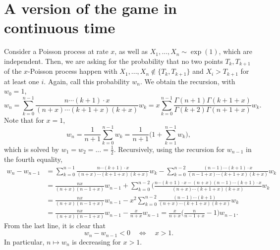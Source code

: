 \documentclass{article}
\theoremstyle{definition}
\theoremstyle{step} \newtheorem{step}{Step}
\begin{document}
\newpage

\section{A version of the game in continuous time}
Consider a Poisson process at rate $x$, as well as $X_1,...,X_n \sim
\exp(1)$, which are independent. Then, we are asking for the
probability that no two points $T_k, T_{k+1}$ of the $x$-Poisson
process happen with $X_1,...,X_n \notin \{T_k, T_{k+1}\}$ and $X_i >
T_{k+1}$ for at least one $i$. Again, call this probability $w_n$. We
obtain the recursion, with $w_0=1$,
$$ w_n = \sum_{k=0}^{n-1} \frac{n\cdots (k+1) \cdot x}{(n+x)\cdots
  (k+1+x)(k+x)} w_k = x \sum_{k=0}^{n-1}
\frac{\Gamma(n+1)\Gamma(k+1+x)}{\Gamma(k+2)\Gamma(n+1+x)} w_k.$$
  Note that for $x=1$,
$$ w_n = \frac{1}{n+1} \sum_{k=0}^{n-1} w_k = \frac{1}{n+1} \Big(1 +
  \sum_{k=1}^{n-1} w_k\Big), $$ which is solved by $w_1 = w_2 = ... =
  \tfrac 12$. Recursively, using the recursion for $w_{n-1}$ in the
  fourth equality,
\begin{align*}
w_n - w_{n-1} & = \sum_{k=0}^{n-1} \frac{n\cdots (k+1) \cdot
  x}{(n+x)\cdots (k+1+x)(k+x)} w_k - \sum_{k=0}^{n-2}
\frac{(n-1)\cdots (k+1) \cdot x}{(n-1+x)\cdots (k+1+x)(k+x)} w_k \\ &
= \frac{nx}{(n+x)(n-1+x)}w_{n-1} + \sum_{k=0}^{n-2}\Big(\frac{n\cdots
  (k+1) \cdot x - (n+x)(n-1)\cdots (k+1) \cdot x}{(n+x)\cdots
  (k+1+x)(k+x)}w_k \\ & = \frac{nx}{(n+x)(n-1+x)}w_{n-1} - x^2
\sum_{k=0}^{n-2} \frac{(n-1)\cdots (k+1)}{(n+x)\cdots (k+1+x)(k+x)}w_k
\\ & =\frac{nx}{(n+x)(n-1+x)}w_{n-1} - \frac{x}{n+x} w_{n-1} =
\frac{x}{n+x} \Big(\frac{n}{n-1+x} - 1\Big)w_{n-1}.
\end{align*}
From the last line, it is clear that
$$w_n - w_{n-1} < 0 \quad \iff \quad x>1. $$
In particular, $n\mapsto w_n$ is decreasing for $x>1$.
\end{document}
